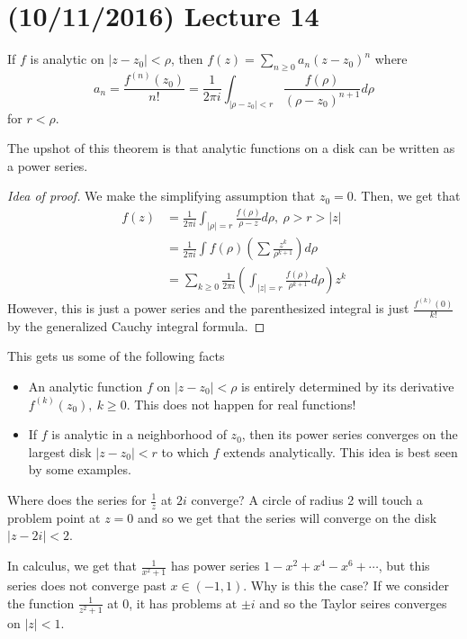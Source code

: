 \documentclass[11pt,leqno,oneside]{amsart}
\begin{document}
  \section{(10/11/2016) Lecture 14}
  \begin{thm}
    If $f$ is analytic on $|z-z_0|<\rho$, then $f(z) = \sum_{n \geq 0}
    a_n(z-z_0)^n$ where \[a_n = \frac{f^{(n)}(z_0)}{n!} =
      \frac{1}{2\pi i}\int_{|\rho - z_0| < r}
      \frac{f(\rho)}{(\rho-z_0)^{n+1}}d\rho \]
    for $r < \rho$.
  \end{thm}
  The upshot of this theorem is that analytic functions on a disk can
  be written as a power series.
  \begin{proof}[Idea of proof]
    We make the simplifying assumption that $z_0 = 0$. Then, we get
    that
    \begin{align*}
      f(z) & = \frac{1}{2 \pi i} \int_{|\rho| = r}
             \frac{f(\rho)}{\rho-z}d\rho, \ \rho > r > |z| \\
      \ & = \frac{1}{2\pi i} \int f(\rho)
          \left(
          \sum \frac{z^k}{\rho^{k+1}}
          \right) d \rho \\
      \ & = \sum_{k \geq 0} \frac{1}{2 \pi i}
          \left(
          \int_{|z|=r} \frac{f(\rho)}{\rho^{k+1}}d\rho
          \right)z^k
    \end{align*}
    However, this is just a power series and the parenthesized
    integral is just $\frac{f^{(k)}(0)}{k!}$ by the generalized Cauchy
    integral formula.
  \end{proof}
  This gets us some of the following facts
  \begin{itemize}
  \item An analytic function $f$ on $|z-z_0| < \rho$ is entirely
    determined by its derivative $f^{(k)}(z_0), \ k \geq 0$. This does
    not happen for real functions!
  \item If $f$ is analytic in a neighborhood of $z_0$, then its power
    series converges on the largest disk $|z-z_0| < r$ to which $f$
    extends analytically. This idea is best seen by some examples.
  \end{itemize}
  \begin{example}
    Where does the series for $\frac{1}{z}$ at $2i$ converge? A circle
    of radius 2 will touch a problem point at $z=0$ and so we get that
    the series will converge on the disk $|z-2i| < 2$.
  \end{example}
  \begin{example}
    In calculus, we get that $\frac{1}{x^2+1}$ has power series
    $1-x^2+x^4-x^6+\cdots$, but this series does not converge past $x
    \in (-1,1)$. Why is this the case? If we consider the function
    $\frac{1}{z^2+1}$ at 0, it has problems at $\pm i$ and so the
    Taylor seires converges on $|z|<1$.
  \end{example}
\end{document}
